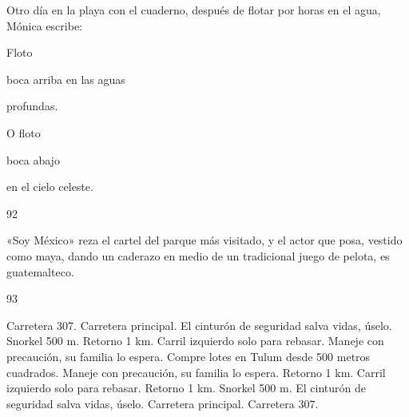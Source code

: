 \documentclass[12pt,twoside,openright,a5paper]{book}
\begin{document}
\nopagebreak

\vspace{0.5cm}

\nopagebreak

Otro día en la playa con el cuaderno, después de
flotar por horas en el agua, Mónica escribe:

\vspace{0.5cm}

Floto

boca arriba en las aguas

profundas.

O floto

boca abajo

en el cielo celeste.

\vspace{0.5cm}

\hrulefill \hspace{0.1cm}\decofourleft\hspace{0.2cm} 92 \hspace{0.2cm}\decofourright \hspace{0.1cm}\hrulefill

\nopagebreak

\vspace{0.5cm}

\nopagebreak

«Soy México» reza el cartel del parque más visitado, y el actor que posa,
vestido como maya, dando un caderazo en medio de un tradicional juego de
pelota, es guatemalteco.

\vspace{0.5cm}

\hrulefill \hspace{0.1cm}\decofourleft\hspace{0.2cm} 93 \hspace{0.2cm}\decofourright \hspace{0.1cm}\hrulefill

\nopagebreak

\vspace{0.5cm}

\nopagebreak

Carretera 307. Carretera principal. El cinturón de seguridad salva
vidas, úselo. Snorkel 500 m. Retorno 1 km. Carril izquierdo solo para
rebasar. Maneje con precaución, su familia lo espera. Compre lotes en Tulum 
desde 500 metros cuadrados. Maneje con precaución, su familia lo espera.
Retorno 1 km. Carril izquierdo solo para
rebasar.
Retorno 1 km.
Snorkel 500 m.
El cinturón de seguridad salva
vidas, úselo.
Carretera principal.
Carretera 307.
\end{document}
